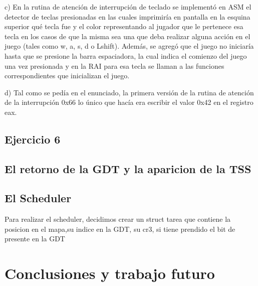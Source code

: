 \documentclass[a4paper]{article}
\newenvironment{codesnippet}{%
	\begin{Sbox}\begin{minipage}{\textwidth}\sffamily\small}%
	{\end{minipage}\end{Sbox}%
		\begin{center}%
		\vspace{-0.4cm}\colorbox{litegrey}{\TheSbox}\end{center}\vspace{0.3cm}}
\begin{document}
c) En la rutina de atención de interrupción de teclado se implementó en ASM el detector de teclas presionadas en las cuales imprimiría en pantalla en la esquina
superior qué tecla fue y el color representando al jugador que le pertenece esa tecla en los casos de que la misma sea una que deba realizar alguna acción en el juego
(tales como w, a, s, d o Lshift). Además, se agregó que el juego no iniciaría hasta que se presione la barra espaciadora, la cual indica el comienzo del juego una vez presionada
y en la RAI para esa tecla se llaman a las funciones correspondientes que inicializan el juego.

d) Tal como se pedía en el enunciado, la primera versión de la rutina de atención de la interrupción 0x66 lo único que hacía era escribir el valor 0x42 en el registro eax.


\subsection{Ejercicio 6}




\subsection{El retorno de la GDT y la aparicion de la TSS}

\subsection{El Scheduler}
Para realizar el scheduler, decidimos crear un struct tarea que contiene la posicion en el mapa,su indice en la GDT, su cr3, si tiene prendido el bit de presente en la GDT

\section{Conclusiones y trabajo futuro}






\end{document}

